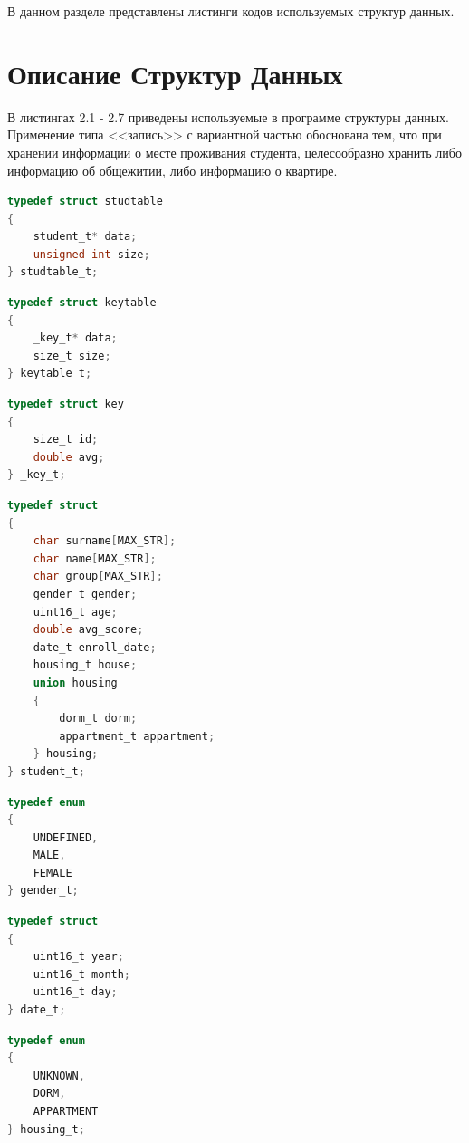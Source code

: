 В данном разделе представлены листинги кодов используемых структур данных.

\section{Описание Структур Данных}

В листингах 2.1 - 2.7 приведены используемые в программе структуры данных. Применение типа <<запись>> с вариантной частью обоснована тем, что при хранении информации о месте проживания студента, целесообразно хранить либо информацию об общежитии, либо информацию о квартире.  

\begin{lstlisting}[language=C,caption=Структура Таблицы]
typedef struct studtable
{
	student_t* data;
	unsigned int size;
} studtable_t;
\end{lstlisting}

\begin{lstlisting}[language=C,caption=Структура таблицы ключей]
typedef struct keytable
{
	_key_t* data;
	size_t size;
} keytable_t;
\end{lstlisting}

\begin{lstlisting}[language=C,caption=Структура ключа]
typedef struct key
{
	size_t id;
	double avg;
} _key_t;
\end{lstlisting}

\begin{lstlisting}[language=C,caption=Структура студента]
typedef struct
{
	char surname[MAX_STR];
	char name[MAX_STR];
	char group[MAX_STR];
	gender_t gender;
	uint16_t age;
	double avg_score;
	date_t enroll_date;
	housing_t house;
	union housing
	{
		dorm_t dorm;
		appartment_t appartment;
	} housing;
} student_t;
\end{lstlisting}

\begin{lstlisting}[language=C,caption=Перечисляемый тип пола]
typedef enum
{
	UNDEFINED,
	MALE,
	FEMALE
} gender_t;
\end{lstlisting}

\begin{lstlisting}[language=C,caption=Структура даты]
typedef struct
{
	uint16_t year;
	uint16_t month;
	uint16_t day;
} date_t;
\end{lstlisting}

\begin{lstlisting}[language=C,caption=Перечисляемый тип жилья]
typedef enum
{
	UNKNOWN,
	DORM,
	APPARTMENT
} housing_t;
\end{lstlisting}

